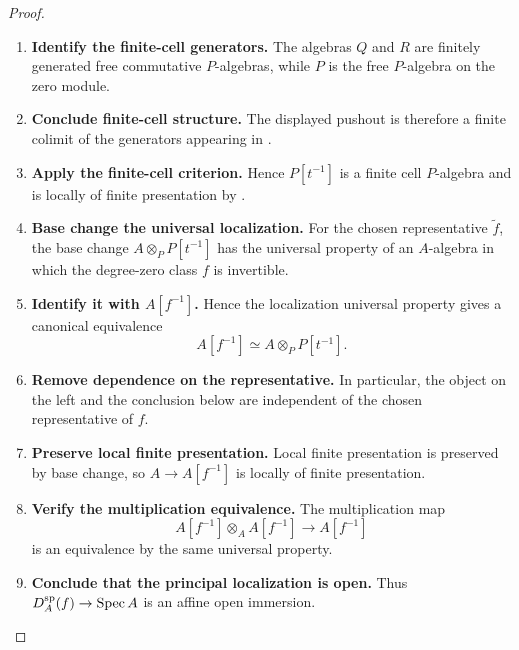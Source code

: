 \begin{proof}
\begin{enumerate}[label=\textup{(\arabic*)}]
    \item \textbf{Identify the finite-cell generators.}
    The algebras \(Q\) and \(R\) are finitely generated free commutative
    \(P\)-algebras, while \(P\) is the free \(P\)-algebra on the zero
    module.

    \item \textbf{Conclude finite-cell structure.}
    The displayed pushout is therefore a finite colimit of the
    generators appearing in .

    \item \textbf{Apply the finite-cell criterion.}
    Hence
    \(P[t^{-1}]\) is a finite cell \(P\)-algebra and is locally of finite
    presentation by .

    \item \textbf{Base change the universal localization.}
    For the chosen representative \(\widetilde f\), the base change
    \(A\otimes_PP[t^{-1}]\) has the universal property of an
    \(A\)-algebra in which the degree-zero class \(f\) is invertible.

    \item \textbf{Identify it with \(A[f^{-1}]\).}
    Hence the localization universal property gives a canonical equivalence
    \[
        A[f^{-1}]
        \simeq
        A\otimes_PP[t^{-1}].
    \]

    \item \textbf{Remove dependence on the representative.}
    In particular, the object on the left and the conclusion below are
    independent of the chosen representative of \(f\).

    \item \textbf{Preserve local finite presentation.}
    Local finite presentation is preserved by base change, so
    \(A\to A[f^{-1}]\) is locally of finite presentation.

    \item \textbf{Verify the multiplication equivalence.}
    The multiplication
    map
    \[
        A[f^{-1}]\otimes_AA[f^{-1}]
        \longrightarrow
        A[f^{-1}]
    \]
    is an equivalence by the same universal property.

    \item \textbf{Conclude that the principal localization is open.}
    Thus \(D_A^{\mathrm{sp}}(f)\to\operatorname{Spec} A\)
    is an affine open immersion.
\end{enumerate}
\end{proof}

